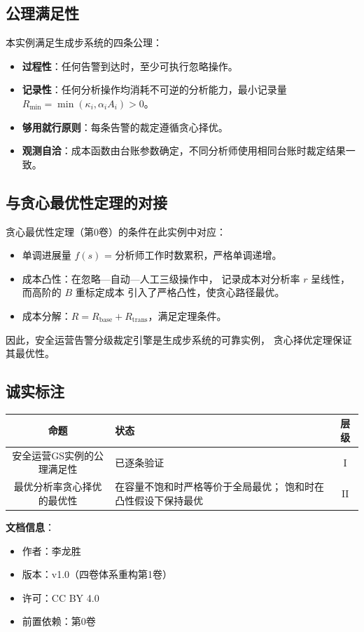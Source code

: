 \documentclass[11pt,a4paper]{article}
\begin{document}
\subsection{公理满足性}

本实例满足生成步系统的四条公理：
\begin{itemize}
    \item \textbf{过程性}：任何告警到达时，至少可执行忽略操作。
    \item \textbf{记录性}：任何分析操作均消耗不可逆的分析能力，最小记录量 $R_{\min} = \min(\kappa_i, \alpha_i A_i) > 0$。
    \item \textbf{够用就行原则}：每条告警的裁定遵循贪心择优。
    \item \textbf{观测自洽}：成本函数由台账参数确定，不同分析师使用相同台账时裁定结果一致。
\end{itemize}

\subsection{与贪心最优性定理的对接}

贪心最优性定理（第0卷）的条件在此实例中对应：
\begin{itemize}
    \item 单调进展量 $f(s)$ = 分析师工作时数累积，严格单调递增。
    \item 成本凸性：在忽略—自动—人工三级操作中，
          记录成本对分析率 $r$ 呈线性，而高阶的 $B$ 重标定成本
          引入了严格凸性，使贪心路径最优。
    \item 成本分解：$R = R_{\text{base}} + R_{\text{trans}}$，满足定理条件。
\end{itemize}

因此，安全运营告警分级裁定引擎是生成步系统的可靠实例，
贪心择优定理保证其最优性。

\subsection{诚实标注}

\begin{center}
\begin{xltabular}{\textwidth}{c|X|c}
\toprule
\textbf{命题} & \textbf{状态} & \textbf{层级} \\
\midrule
安全运营GS实例的公理满足性 &
已逐条验证 &
I \\
最优分析率贪心择优的最优性 &
在容量不饱和时严格等价于全局最优；
饱和时在凸性假设下保持最优 &
II \\
\bottomrule
\end{xltabular}
\end{center}

\vspace{5mm}
\noindent\textbf{文档信息}：
\begin{itemize}
    \item 作者：李龙胜
    \item 版本：v1.0（四卷体系重构第1卷）
    \item 许可：CC BY 4.0
    \item 前置依赖：第0卷
\end{itemize}
\end{document}
